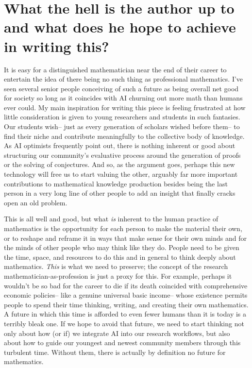 \documentclass[11pt,reqno]{amsart}
\theoremstyle{plain}
\theoremstyle{definition}
\numberwithin{equation}{section}
\numberwithin{theorem}{section}
\begin{document}
\section{What the hell is the author up to and what does he hope to achieve in writing this? 
}

It is easy for a distinguished mathematician near the end of their career to entertain the idea of there being no such thing as professional mathematics. I’ve seen several senior people conceiving of such a future as being overall net good for society so long as it coincides with AI churning out more math than humans ever could. My main inspiration for writing this piece is feeling frustrated at how little consideration is given to young researchers and students in such fantasies. Our students wish– just as every generation of scholars wished before them– to find their niche and contribute meaningfully to the collective body of knowledge. As AI optimists frequently point out, there is nothing inherent or good about structuring our community’s evaluative process around the generation of proofs or the solving of conjectures. And so, as the argument goes, perhaps this new technology will free us to start valuing the other, arguably far more important contributions to mathematical knowledge production besides being the last person in a very long line of other people to add an insight that finally cracks open an old problem. 

This is all well and good, but what \textit{is} inherent to the human practice of mathematics is the opportunity for each person to make the material their own, or to reshape and reframe it in ways that make sense for their own minds and for the minds of other people who may think like they do. People need to be given the time, space, and resources to do this and in general to think deeply about mathematics. \textit{This} is what we need to preserve; the concept of the research mathematician-as-profession is just a proxy for this. For example, perhaps it wouldn’t be so bad for the career to die if its death coincided with comprehensive economic policies– like a genuine universal basic income– whose existence permits people to spend their time thinking, writing, and creating their own mathematics. A future in which this time is afforded to even fewer humans than it is today is a terribly bleak one. If we hope to avoid that future, we need to start thinking not only about how (or if) we integrate AI into our research workflows, but also about how to guide our youngest and newest community members through this turbulent time. Without them, there is actually by definition no future for mathematics. 
\end{document}
